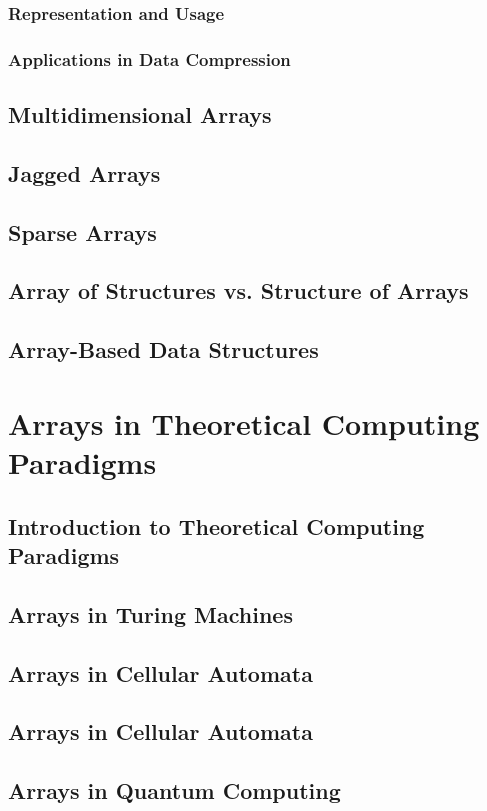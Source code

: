 \documentclass[12pt, oneside]{book}
\begin{document}
	\subsection{Representation and Usage}
	\subsection{Applications in Data Compression}
	\section{Multidimensional Arrays}
	\section{Jagged Arrays}
	\section{Sparse Arrays}
	\section{Array of Structures vs. Structure of Arrays}
	\section{Array-Based Data Structures}

\chapter{Arrays in Theoretical Computing Paradigms}

\section{Introduction to Theoretical Computing Paradigms}
\section{Arrays in Turing Machines}
\section{Arrays in Cellular Automata}
\section{Arrays in Cellular Automata}
\section{Arrays in Quantum Computing}
\end{document}
